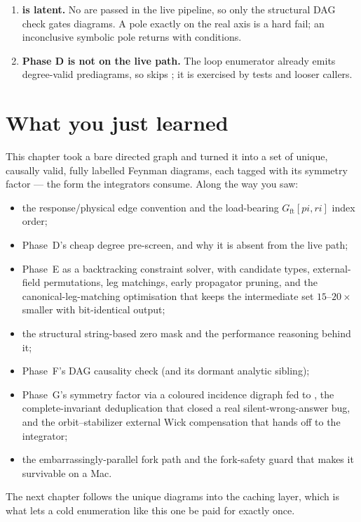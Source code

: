 \begin{enumerate}
        never certified notebook safety.
  \item \textbf{ is latent.} No  are
        passed in the live pipeline, so only the structural DAG check gates
        diagrams. A pole exactly on the real axis is a hard fail; an inconclusive
        symbolic pole returns  with conditions.
  \item \textbf{Phase D is not on the live path.} The loop enumerator already
        emits degree-valid prediagrams, so 
        skips ; it is exercised by tests and looser
        callers.
\end{enumerate}

\section{What you just learned}

This chapter took a bare directed graph and turned it into a set of unique,
causally valid, fully labelled Feynman diagrams, each tagged with its symmetry
factor --- the form the integrators consume. Along the way you saw:

\begin{itemize}
  \item the response/physical edge convention and the load-bearing
        $G_{\mathrm{ft}}[pi, ri]$ index order;
  \item Phase~D's cheap degree pre-screen, and why it is absent from the live
        path;
  \item Phase~E as a backtracking constraint solver, with candidate types,
        external-field permutations, leg matchings, early propagator pruning, and
        the canonical-leg-matching optimisation that keeps the intermediate set
        $15$--$20\times$ smaller with bit-identical output;
  \item the structural string-based zero mask and the performance reasoning
        behind it;
  \item Phase~F's DAG causality check (and its dormant analytic sibling);
  \item Phase~G's symmetry factor via a coloured incidence digraph fed to
        , the complete-invariant deduplication that closed a real
        silent-wrong-answer bug, and the orbit--stabilizer external Wick
        compensation that hands off to the integrator;
  \item the embarrassingly-parallel fork path and the fork-safety guard that
        makes it survivable on a Mac.
\end{itemize}

The next chapter follows the unique diagrams into the caching layer, which is
what lets a cold enumeration like this one be paid for exactly once.
